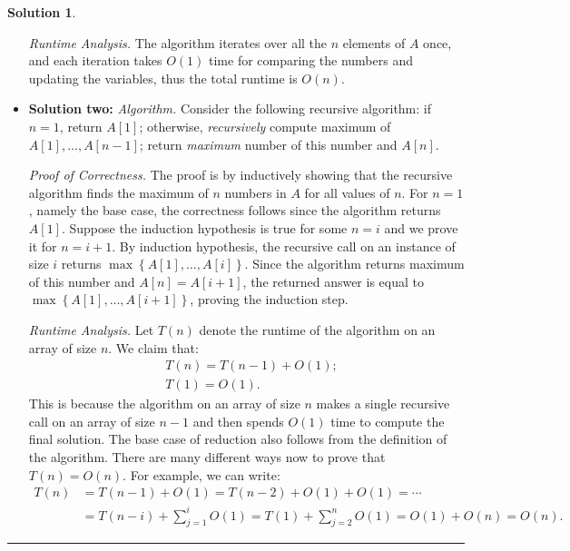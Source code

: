 \documentclass{article}
\theoremstyle{definition}
\def\fline{\rule{0.75\linewidth}{0.5pt}}
\newcommand{\finishline}{\vspace{-15pt}\begin{center}\fline\end{center}}
\newtheorem*{solution*}{Solution}
\newenvironment{solution}{\begin{solution*}}{{\finishline} \end{solution*}}
\newcommand{\set}[1]{\ensuremath{\left\{ #1 \right\}}}
\begin{document}
\begin{solution}
\begin{itemize}
		\smallskip
		\emph{Runtime Analysis.} The algorithm iterates over all the $n$ elements of $A$ once, and each iteration takes $O(1)$ time for comparing the numbers and updating the variables, thus the total runtime is $O(n)$. 
	
		\item \textbf{Solution two:} \emph{Algorithm.} Consider the following recursive algorithm: if $n=1$, return $A[1]$; otherwise, \emph{recursively} compute maximum of $A[1],\ldots,A[n-1]$; return \emph{maximum} number of this number and $A[n]$. 

		
		\smallskip
		\emph{Proof of Correctness.} The proof is by inductively showing that the recursive algorithm finds the maximum of $n$ numbers in $A$ for all values of $n$. For $n=1$, namely the base case, the correctness
		 follows since the algorithm returns $A[1]$. Suppose the induction hypothesis is true for some $n=i$ and we prove it for $n=i+1$. By induction hypothesis, the recursive call on an instance of size $i$ returns $\max\set{A[1],\ldots,A[i]}$. 
		 Since the algorithm returns maximum of this number and $A[n] = A[i+1]$, the returned answer is equal to $\max\set{A[1],\ldots,A[i+1]}$, proving the induction step. 
		 
		 \smallskip
		 \emph{Runtime Analysis.} Let $T(n)$ denote the runtime of the algorithm on an array of size $n$. We claim that:
		 \begin{align*}
		 	&T(n) = T(n-1) + O(1); \\
			&T(1) = O(1). 	
		 \end{align*}
		 This is because the algorithm on an array of size $n$ makes a single recursive call on an array of size $n-1$ and then spends $O(1)$ time to compute the final solution. The base case of reduction also follows from the definition of the algorithm.
		  There are many different ways now to prove that $T(n) = O(n)$. For example, we can write:
		 \begin{align*}
		 	T(n) &= T(n-1) + O(1) = T(n-2) + O(1) + O(1) = \cdots  \\
			 &= T(n-i) + \sum_{j=1}^{i} O(1) = T(1) + \sum_{j=2}^{n} O(1) = O(1) + O(n) = O(n). 
		 \end{align*}		 
	 \end{itemize}
\end{solution}
\end{document}
